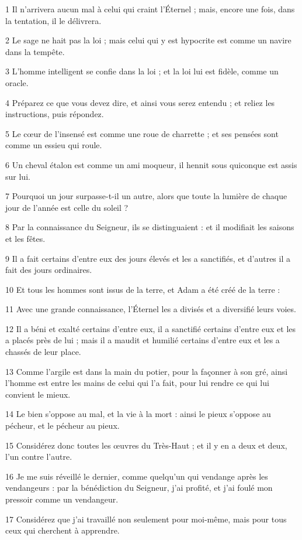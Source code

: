 \par 1 Il n'arrivera aucun mal à celui qui craint l'Éternel ; mais, encore une fois, dans la tentation, il le délivrera.
\par 2 Le sage ne hait pas la loi ; mais celui qui y est hypocrite est comme un navire dans la tempête.
\par 3 L'homme intelligent se confie dans la loi ; et la loi lui est fidèle, comme un oracle.
\par 4 Préparez ce que vous devez dire, et ainsi vous serez entendu ; et reliez les instructions, puis répondez.
\par 5 Le cœur de l'insensé est comme une roue de charrette ; et ses pensées sont comme un essieu qui roule.
\par 6 Un cheval étalon est comme un ami moqueur, il hennit sous quiconque est assis sur lui.
\par 7 Pourquoi un jour surpasse-t-il un autre, alors que toute la lumière de chaque jour de l'année est celle du soleil ?
\par 8 Par la connaissance du Seigneur, ils se distinguaient : et il modifiait les saisons et les fêtes.
\par 9 Il a fait certains d'entre eux des jours élevés et les a sanctifiés, et d'autres il a fait des jours ordinaires.
\par 10 Et tous les hommes sont issus de la terre, et Adam a été créé de la terre :
\par 11 Avec une grande connaissance, l'Éternel les a divisés et a diversifié leurs voies.
\par 12 Il a béni et exalté certains d'entre eux, il a sanctifié certains d'entre eux et les a placés près de lui ; mais il a maudit et humilié certains d'entre eux et les a chassés de leur place.
\par 13 Comme l'argile est dans la main du potier, pour la façonner à son gré, ainsi l'homme est entre les mains de celui qui l'a fait, pour lui rendre ce qui lui convient le mieux.
\par 14 Le bien s'oppose au mal, et la vie à la mort : ainsi le pieux s'oppose au pécheur, et le pécheur au pieux.
\par 15 Considérez donc toutes les œuvres du Très-Haut ; et il y en a deux et deux, l'un contre l'autre.
\par 16 Je me suis réveillé le dernier, comme quelqu'un qui vendange après les vendangeurs : par la bénédiction du Seigneur, j'ai profité, et j'ai foulé mon pressoir comme un vendangeur.
\par 17 Considérez que j'ai travaillé non seulement pour moi-même, mais pour tous ceux qui cherchent à apprendre.
